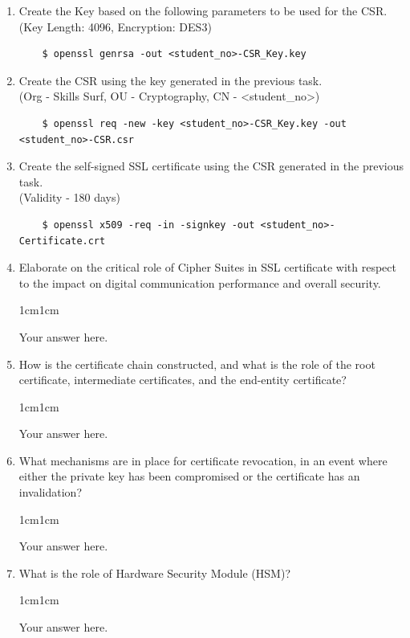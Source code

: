 \documentclass[11pt,letterpaper]{article}
\newenvironment{answer}{\em \color{blue} \begin{adjustwidth}{1cm}{1cm}}{\end{adjustwidth}}
\begin{document}
\begin{enumerate}

   \item Create the Key based on the following parameters to be used for the CSR. \\(Key Length: 4096, Encryption: DES3)
    \begin{Verbatim}
    $ openssl genrsa -out <student_no>-CSR_Key.key 
    \end{Verbatim}
        
    \item Create the CSR using the key generated in the previous task. 
    \\ (Org - Skills Surf, OU - Cryptography, CN - \textless student\_no\textgreater)
    \begin{Verbatim}
    $ openssl req -new -key <student_no>-CSR_Key.key -out <student_no>-CSR.csr
    \end{Verbatim}

    \item Create the self-signed SSL certificate using the CSR generated in the previous task. 
    \\ (Validity - 180 days)
    \begin{Verbatim}
    $ openssl x509 -req -in -signkey -out <student_no>-Certificate.crt
    \end{Verbatim}

    \item Elaborate on the critical role of Cipher Suites in SSL certificate with respect to the impact on digital communication performance and overall security. 
    \begin{answer}
	
		Your answer here.
		
	\end{answer}
    \item How is the certificate chain constructed, and what is the role of the root certificate, intermediate certificates, and the end-entity certificate?
    \begin{answer}
	
		Your answer here.
		
	\end{answer}
    \item What mechanisms are in place for certificate revocation, in an event where either the private key has been compromised or the certificate has an invalidation?
    \begin{answer}
	
		Your answer here.
		
	\end{answer}
    \item What is the role of Hardware Security Module (HSM)?
    \begin{answer}
	
		Your answer here.
		
	\end{answer}

\end{enumerate}
\end{document}
